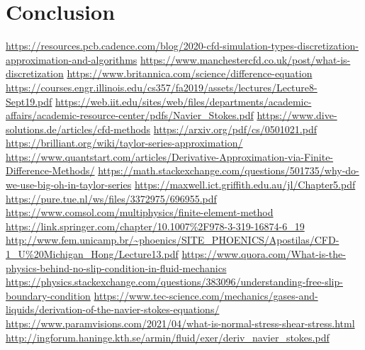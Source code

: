 \documentclass{article}
\begin{document}
\newpage
\section{Conclusion}


\newpage
\begin{thebibliography}{3}
\url{https://resources.pcb.cadence.com/blog/2020-cfd-simulation-types-discretization-approximation-and-algorithms}
\url{https://www.manchestercfd.co.uk/post/what-is-discretization}
\url{https://www.britannica.com/science/difference-equation}
\url{https://courses.engr.illinois.edu/cs357/fa2019/assets/lectures/Lecture8-Sept19.pdf}
\url{https://web.iit.edu/sites/web/files/departments/academic-affairs/academic-resource-center/pdfs/Navier_Stokes.pdf}
\url{https://www.dive-solutions.de/articles/cfd-methods}
\url{https://arxiv.org/pdf/cs/0501021.pdf}
\url{https://brilliant.org/wiki/taylor-series-approximation/}
\url{https://www.quantstart.com/articles/Derivative-Approximation-via-Finite-Difference-Methods/}
\url{https://math.stackexchange.com/questions/501735/why-do-we-use-big-oh-in-taylor-series}
\url{https://maxwell.ict.griffith.edu.au/jl/Chapter5.pdf}
\url{https://pure.tue.nl/ws/files/3372975/696955.pdf}
\url{https://www.comsol.com/multiphysics/finite-element-method}
\url{https://link.springer.com/chapter/10.1007\%2F978-3-319-16874-6\_19}
\url{http://www.fem.unicamp.br/~phoenics/SITE_PHOENICS/Apostilas/CFD-1_U\%20Michigan_Hong/Lecture13.pdf}
\url{https://www.quora.com/What-is-the-physics-behind-no-slip-condition-in-fluid-mechanics}
\url{https://physics.stackexchange.com/questions/383096/understanding-free-slip-boundary-condition}
\url{https://www.tec-science.com/mechanics/gases-and-liquids/derivation-of-the-navier-stokes-equations/}
\url{https://www.paramvisions.com/2021/04/what-is-normal-stress-shear-stress.html}
\url{http://ingforum.haninge.kth.se/armin/fluid/exer/deriv_navier_stokes.pdf}

\end{thebibliography}
\end{document}
